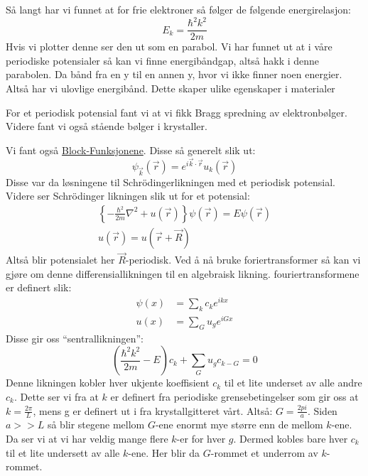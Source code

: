 \documentclass{article}
\begin{document}
Så langt har vi funnet at for frie elektroner så følger de følgende energirelasjon:
\begin{equation}
  \label{eq:energi_for_frie_elektroner}
  E_k = \frac{\hbar^2 k^2}{2m}
\end{equation}
Hvis vi plotter denne ser den ut som en parabol. Vi har funnet ut at i våre periodiske potensialer så kan vi finne energibåndgap, altså hakk i denne parabolen. Da bånd fra en y til en annen y, hvor vi ikke finner noen energier. Altså har vi ulovlige energibånd. Dette skaper ulike egenskaper i materialer %

For et periodisk potensial fant vi at vi fikk Bragg spredning av elektronbølger. Videre fant vi også stående bølger i krystaller.

Vi fant også \underline{Block-Funksjonene}. Disse så generelt slik ut:
\begin{equation}
  \label{eq:block_funksjoner}
  \psi_{\vec{k}}(\vec{r}) = e^{i\vec{k}\cdot\vec{r}}u_k(\vec{r})
\end{equation}
Disse var da løsningene til Schrödingerlikningen med et periodisk potensial.
Videre ser Schrödinger likningen slik ut for et potensial:
\begin{align}
  \label{eq:schrödinger_likningen_med_periodisk_potensial}
  \left\{  -\frac{\hbar^2}{2m}\nabla^2 + u(\vec{r})  \right\}\psi(\vec{r}) = E\psi(\vec{r}) \\
  u(\vec{r}) = u(\vec{r} + \vec{R})
\end{align}
Altså blir potensialet her $\vec{R}$-periodisk. Ved å nå bruke foriertransformer så kan vi gjøre om denne differensiallikningen til en algebraisk likning. fouriertransformene er definert slik:
\begin{align*}
  \psi(x) &= \sum_k c_k e^{ikx} \\
  u(x) &= \sum_G u_g e^{iGx}
\end{align*}
Disse gir oss \enquote{sentrallikningen}:
\begin{equation}
  \label{eq:den_sentrale_likningen}
  \left(\frac{\hbar^2 k^2}{2m} - E\right)c_k + \sum_G u_g c_{k-G} = 0
\end{equation}
Denne likningen kobler hver ukjente koeffisient $c_k$ til et lite underset av alle andre $c_k$. Dette ser vi fra at $k$ er definert fra periodiske grensebetingelser som gir oss at $k = \frac{2\pi}{L}$, mens g er definert ut i fra krystallgitteret vårt. Altså: $G = \frac{2pi}{a}$. Siden $a >> L$ så blir stegene mellom $G$-ene enormt mye større enn de mellom $k$-ene. Da ser vi at vi har veldig mange flere $k$-er for hver $g$. Dermed kobles bare hver $c_k$ til et lite undersett av alle $k$-ene. Her blir da $G$-rommet et underrom av $k$-rommet.
\end{document}
